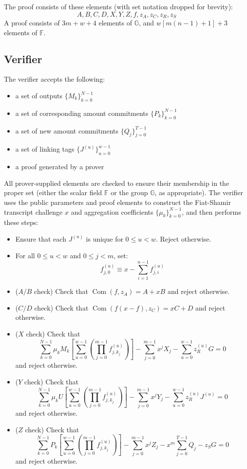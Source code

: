 \documentclass[draft]{article} %
\newcommand{\G}{\mathbb{G}}
\newcommand{\F}{\mathbb{F}}
\newcommand{\com}{\operatorname{Com}}
\newcommand{\sumj}{\sum_{j=0}^{m-1}}
\newcommand{\sumk}{\sum_{k=0}^{N-1}}
\newcommand{\sumu}{\sum_{u=0}^{w-1}}
\begin{document}
The proof consists of these elements (with set notation dropped for brevity):
$$A,B,C,D,X,Y,Z,f,z_A,z_C,z_R,z_S$$
A proof consists of $3m + w + 4$ elements of $\G$, and $w\left[ m(n-1) + 1 \right] + 3$ elements of $\F$.


\subsection{Verifier}
The verifier accepts the following:
\begin{itemize}
\item a set of outputs $\{M_k\}_{k=0}^{N-1}$
\item a set of corresponding amount commitments $\{P_k\}_{k=0}^{N-1}$
\item a set of new amount commitments $\{Q_j\}_{j=0}^{T-1}$
\item a set of linking tags $\{J^{(u)}\}_{u=0}^{w-1}$
\item a proof generated by a prover
\end{itemize}

All prover-supplied elements are checked to ensure their membership in the proper set (either the scalar field $\F$ or the group $\G$, as appropriate).
The verifier uses the public parameters and proof elements to construct the Fiat-Shamir transcript challenge $x$ and aggregation coefficients $\{\mu_k\}_{k=0}^{N-1}$, and then performs these steps:
\begin{itemize}
\item Ensure that each $J^{(u)}$ is unique for $0 \leq u < w$.
Reject otherwise.
\item For all $0 \leq u < w$ and $0 \leq j < m$, set: $$f^{(u)}_{j,0} \equiv x - \sum_{i=1}^{n-1} f^{(u)}_{j,i}$$
\item{($A/B$ check)} Check that $\com(f,z_A) = A + xB$ and reject otherwise.
\item{($C/D$ check)} Check that $\com(f(x-f),z_C) = xC + D$ and reject otherwise.
\item{($X$ check)} Check that $$\sumk \mu_kM_k \left[ \sumu \left( \prod_{j=0}^{m-1} f^{(u)}_{j,k_j} \right) \right] - \sumj x^jX_j - \sumu z^{(u)}_RG = 0$$ and reject otherwise.
\item{($Y$ check)} Check that $$\sumk \mu_kU \left[ \sumu \left( \prod_{j=0}^{m-1} f^{(u)}_{j,k_j} \right) \right] - \sumj x^jY_j - \sumu z^{(u)}_RJ^{(u)} = 0$$ and reject otherwise.
\item{($Z$ check)} Check that $$\sumk P_k \left[ \sumu \left( \prod_{j=0}^{m-1} f^{(u)}_{j,k_j} \right) \right] - \sumj x^jZ_j - x^m\sum_{j=0}^{T-1} Q_j - z_SG = 0$$ and reject otherwise.
\end{itemize}
\end{document}
